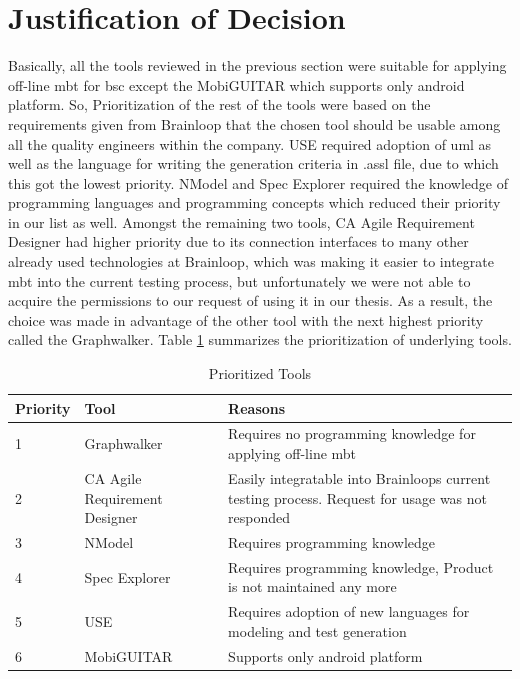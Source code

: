 \section{Justification of Decision}

\par
Basically, all the tools reviewed in the previous section were suitable for applying off-line \acrshort{mbt} for \acrshort{bsc} except the MobiGUITAR which supports only android platform. So, Prioritization of the rest of the tools were based on the requirements given from Brainloop that the chosen tool should be usable among all the quality engineers within the company. USE required adoption of \acrshort{uml} as well as the language for writing the generation criteria in .assl file, due to which this got the lowest priority. NModel and Spec Explorer required the knowledge of programming languages and programming concepts which reduced their priority in our list as well. Amongst the remaining two tools, CA Agile Requirement Designer had higher priority due to its connection interfaces to many other already used technologies at Brainloop, which was making it easier to integrate \acrshort{mbt} into the current testing process, but unfortunately we were not able to acquire the permissions to our request of using it in our thesis. As a result, the choice was made in advantage of the other tool with the next highest priority called the Graphwalker. Table \ref{tab:Prioritized_Tools} summarizes the prioritization of underlying tools.

\begin{table}[]
    \centering
    \begin{tabular}{|l|l|p{8cm}|}
        \hline
        Priority & Tool & Reasons \\
        \hline
        1 & Graphwalker & Requires no programming knowledge for applying off-line \acrshort{mbt} \\
        \hline
        2 & CA Agile Requirement Designer & Easily integratable into Brainloops current testing process. Request for usage was not responded \\
        \hline
        3 & NModel & Requires programming knowledge \\
        \hline
        4 & Spec Explorer & Requires programming knowledge, Product is not maintained any more \\
        \hline
        5 & USE & Requires adoption of new languages for modeling and test generation\\
        \hline
        6 & MobiGUITAR & Supports only android platform \\
        \hline
    \end{tabular}
    \caption{Prioritized Tools}
    \label{tab:Prioritized_Tools}
\end{table}